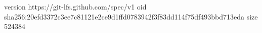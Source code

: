 version https://git-lfs.github.com/spec/v1
oid sha256:20efd3372c3ee7c81121e2ce9d1ffd0783942f3f83dd114f75df493bbd713eda
size 524384
